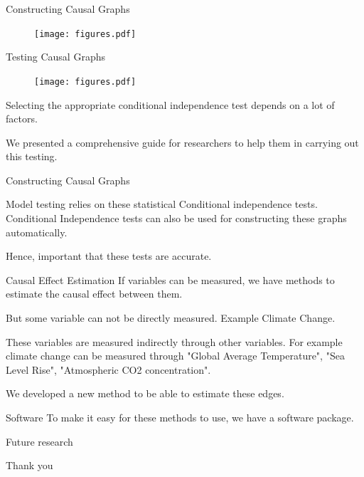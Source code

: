 \documentclass[aspectratio=169]{beamer}
\begin{document}
\begin{frame}{Constructing Causal Graphs}

\begin{figure}
	\texttt{[image: figures.pdf]}
\end{figure}

	
\end{frame}

\begin{frame}{Testing Causal Graphs}
	\begin{figure}
		\texttt{[image: figures.pdf]}
	\end{figure}

	Selecting the appropriate conditional independence test depends on a
	lot of factors.

	We presented a comprehensive guide for researchers to help them in
	carrying out this testing.
\end{frame}

\begin{frame}{Constructing Causal Graphs}

	Model testing relies on these statistical Conditional independence tests.
	Conditional Independence tests can also be used for constructing these graphs
	automatically.

	Hence, important that these tests are accurate.
\end{frame}

\begin{frame}{Causal Effect Estimation}
	If variables can be measured, we have methods to estimate the causal effect between them.

	But some variable can not be directly measured. Example Climate Change.

	These variables are measured indirectly through other variables. For example climate change can be measured through "Global Average Temperature", "Sea Level Rise", "Atmospheric CO2 concentration".

	We developed a new method to be able to estimate these edges.
\end{frame}

\begin{frame}{Software}
	To make it easy for these methods to use, we have a software package.
\end{frame}

\begin{frame}{Future research}	
\end{frame}

\begin{frame}
	\Huge{Thank you}
\end{frame}
\end{document}
